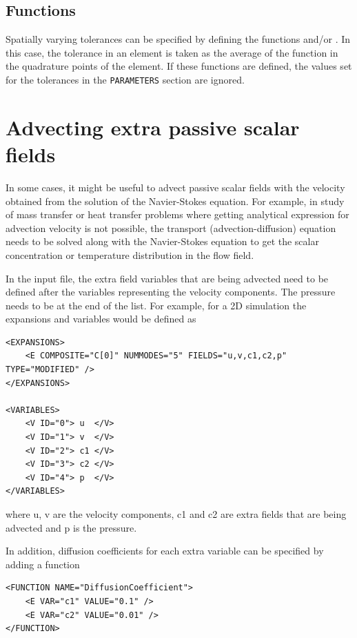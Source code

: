 \subsection{Functions}

Spatially varying tolerances can be specified by defining the
functions  and/or
. In this case, the tolerance in an
element is taken as the average of the function in the quadrature
points of the element. If these functions are defined, the values set
for the tolerances in the \texttt{PARAMETERS} section are ignored.

\section{Advecting extra passive scalar fields}

In some cases, it might be useful to advect passive scalar fields with the velocity obtained from the
solution of the Navier-Stokes equation. For example, in study of mass transfer or heat transfer problems
where getting analytical expression for advection velocity is not possible, the transport (advection-diffusion)
equation needs to be solved along with the Navier-Stokes equation to get the scalar concentration or
temperature distribution in the flow field.

In the input file, the extra field variables that are being advected need to be defined after the variables
representing the velocity components. The pressure needs to be at the end of the list. For example, for
a 2D simulation the expansions and variables would be defined as

\begin{lstlisting}[style=XMLStyle]
<EXPANSIONS>
    <E COMPOSITE="C[0]" NUMMODES="5" FIELDS="u,v,c1,c2,p" TYPE="MODIFIED" />
</EXPANSIONS>

<VARIABLES>
    <V ID="0"> u  </V>
    <V ID="1"> v  </V>
    <V ID="2"> c1 </V>
    <V ID="3"> c2 </V>
    <V ID="4"> p  </V>
</VARIABLES>
\end{lstlisting}
where u, v are the velocity components, c1 and c2 are extra fields that are being advected and p is the pressure.

In addition, diffusion coefficients for each extra variable can be specified by adding a function
\begin{lstlisting}[style=XMLStyle]
<FUNCTION NAME="DiffusionCoefficient">
    <E VAR="c1" VALUE="0.1" />
    <E VAR="c2" VALUE="0.01" />
</FUNCTION>
\end{lstlisting}

